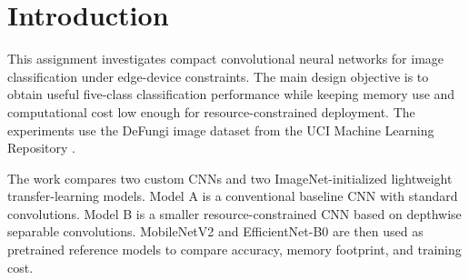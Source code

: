 \section{Introduction}

This assignment investigates compact convolutional neural networks for image classification under edge-device constraints. The main design objective is to obtain useful five-class classification performance while keeping memory use and computational cost low enough for resource-constrained deployment. The experiments use the DeFungi image dataset from the UCI Machine Learning Repository \cite{defungi_uci}.

The work compares two custom CNNs and two ImageNet-initialized lightweight transfer-learning models. Model A is a conventional baseline CNN with standard convolutions. Model B is a smaller resource-constrained CNN based on depthwise separable convolutions. MobileNetV2 \cite{mobilenetv2} and EfficientNet-B0 \cite{efficientnet} are then used as pretrained reference models to compare accuracy, memory footprint, and training cost.

